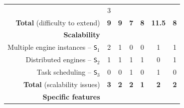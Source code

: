 \documentclass[preprint,3p,twocolumn]{elsarticle}
\begin{document}
\begin{table}
\begin{tabular}{rcccccc}
                                     & \cellcolor[HTML]{99E899}3\\
  \textbf{Total} (difficulty to extend) & \cellcolor[HTML]{99E099}\textbf{9}
                                     & \cellcolor[HTML]{99E099}\textbf{9}
                                     & \cellcolor[HTML]{99FF99}\textbf{7}
                                     & \cellcolor[HTML]{99EF99}\textbf{8}
                                     & \cellcolor[HTML]{99BB99}\textbf{11.5}
                                     & \cellcolor[HTML]{99EF99}\textbf{8}\\
\cellcolor[HTML]{EEEEEE}\textbf{Scalability}& \multicolumn{6}{l}{\cellcolor[HTML]{EEEEEE}}\\
Multiple engine instances -- \texttt{S$_1$}& \cellcolor[HTML]{99BB99}2
                                     & \cellcolor[HTML]{99DD99}1
                                     & \cellcolor[HTML]{99FF99}0
                                     & \cellcolor[HTML]{99FF99}0
                                     & \cellcolor[HTML]{99DD99}1
                                     & \cellcolor[HTML]{99DD99}1\\
Distributed engines -- \texttt{S$_2$}& \cellcolor[HTML]{99BB99}1
                                     & \cellcolor[HTML]{99BB99}1
                                     & \cellcolor[HTML]{99BB99}1
                                     & \cellcolor[HTML]{99BB99}1
                                     & \cellcolor[HTML]{99FF99}0
                                     & \cellcolor[HTML]{99BB99}1\\
Task scheduling -- \texttt{S$_3$}    & \cellcolor[HTML]{99FF99}0
                                     & \cellcolor[HTML]{99FF99}0
                                     & \cellcolor[HTML]{99BB99}1
                                     & \cellcolor[HTML]{99FF99}0
                                     & \cellcolor[HTML]{99BB99}1
                                     & \cellcolor[HTML]{99FF99}0\\
\textbf{Total} (scalability issues)  & \cellcolor[HTML]{99BB99}\textbf{3}
                                     & \cellcolor[HTML]{99DD99}\textbf{2}
                                     & \cellcolor[HTML]{99DD99}\textbf{2}
                                     & \cellcolor[HTML]{99FF99}\textbf{1}
                                     & \cellcolor[HTML]{99DD99}\textbf{2}
                                     & \cellcolor[HTML]{99DD99}\textbf{2}\\
\cellcolor[HTML]{EEEEEE}\textbf{Specific features}& \multicolumn{6}{l}{\cellcolor[HTML]{EEEEEE}}\\

\end{tabular}
\end{table}
\end{document}
